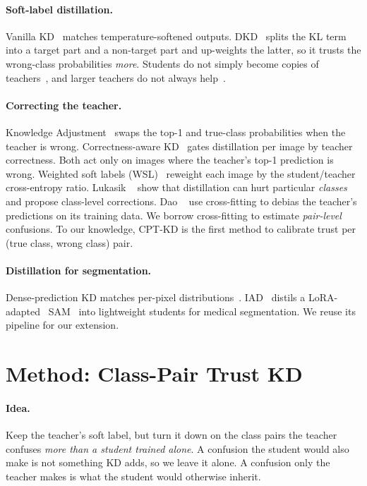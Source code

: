\documentclass[10pt,twocolumn,letterpaper]{article}
\begin{document}
\paragraph{Soft-label distillation.} Vanilla KD~\cite{hinton2015distilling} matches temperature-softened outputs. DKD~\cite{zhao2022dkd} splits the KL term into a target part and a non-target part and up-weights the latter, so it trusts the wrong-class probabilities \emph{more}. Students do not simply become copies of teachers~\cite{stanton2021does}, and larger teachers do not always help~\cite{cho2019efficacy,mirzadeh2020takd}.

\paragraph{Correcting the teacher.} Knowledge Adjustment~\cite{wen2021preparing} swaps the top-1 and true-class probabilities when the teacher is wrong. Correctness-aware KD~\cite{mishra2026correctness} gates distillation per image by teacher correctness. Both act only on images where the teacher's top-1 prediction is wrong. Weighted soft labels (WSL)~\cite{zhou2021wsl} reweight each image by the student/teacher cross-entropy ratio. Lukasik \etal~\cite{lukasik2022teacherspet} show that distillation can hurt particular \emph{classes} and propose class-level corrections. Dao \etal~\cite{dao2021semiparametric} use cross-fitting to debias the teacher's predictions on its training data. We borrow cross-fitting to estimate \emph{pair-level} confusions. To our knowledge, CPT-KD is the first method to calibrate trust per (true class, wrong class) pair.

\paragraph{Distillation for segmentation.} Dense-prediction KD matches per-pixel distributions~\cite{shu2021cwd}. IAD~\cite{hong2026iad} distils a LoRA-adapted~\cite{hu2022lora} SAM~\cite{kirillov2023sam} into lightweight students for medical segmentation. We reuse its pipeline for our extension.

\section{Method: Class-Pair Trust KD}
\label{sec:method}
\paragraph{Idea.} Keep the teacher's soft label, but turn it down on the class pairs the teacher confuses \emph{more than a student trained alone}. A confusion the student would also make is not something KD adds, so we leave it alone. A confusion only the teacher makes is what the student would otherwise inherit.
\end{document}
